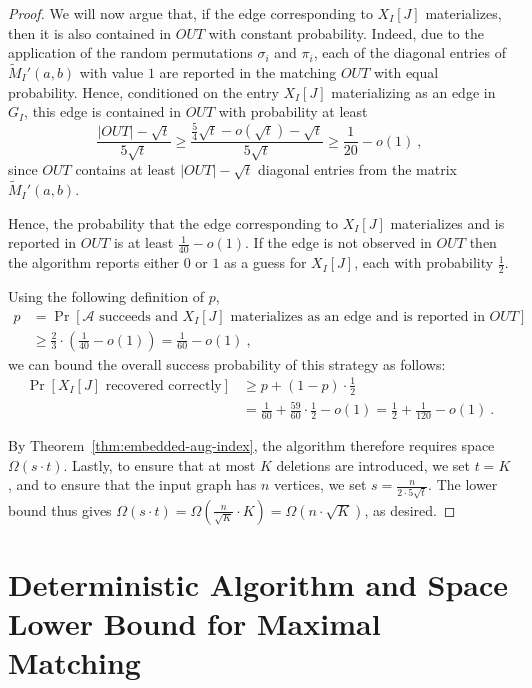 \documentclass[11pt,a4paper]{article}
\begin{document}
\begin{proof}
We will now argue that, if the edge corresponding to $X_I[J]$ materializes, then it is also contained in $OUT$ with constant probability. Indeed, due to the application of the random permutations $\sigma_i$ and $\pi_i$, each of the diagonal entries of $\tilde{M}_I'(a,b)$ with value $1$ are reported in the matching $OUT$ with equal probability. Hence, conditioned on the entry $X_I[J]$ materializing as an edge in $G_I$, this edge is contained in $OUT$ with probability at least 
$$\frac{|OUT| - \sqrt{t}}{5 \sqrt{t}} \ge \frac{\frac{5}{4} \sqrt{t} - o(\sqrt{t}) - \sqrt{t}}{5 \sqrt{t} } \ge \frac{1}{20} - o(1) \ , $$ since $OUT$ contains at least $|OUT| - \sqrt{t}$ diagonal entries from the matrix $\tilde{M}_I'(a,b)$. 

Hence, the probability that the edge corresponding to $X_I[J]$ materializes and is reported in $OUT$ is at least $\frac{1}{40} - o(1)$. If the edge is not observed in $OUT$ then the algorithm reports either $0$  or $1$ as a guess for $X_I[J]$, each with probability $\frac{1}{2}$. 

Using the following definition of $p$,
\begin{align*}
    p & = \Pr[\mathcal{A} \mbox{ succeeds and } X_I[J] \mbox{ materializes as an edge and is reported in } OUT] \\
    & \ge \frac{2}{3} \cdot (\frac{1}{40}-o(1)) = \frac{1}{60} - o(1) \ ,    
\end{align*} 
we can bound the overall success probability of this strategy as follows:
\begin{align*}
  \Pr[X_I[J]  \mbox{ recovered correctly}] & 
  \ge p + (1-p) \cdot \frac{1}{2} \\
  & = \frac{1}{60} + \frac{59}{60} \cdot \frac{1}{2} - o(1)  = \frac{1}{2} + \frac{1}{120} - o(1) \ .
\end{align*}



By Theorem~\ref{thm:embedded-aug-index}, the algorithm therefore requires space $\Omega(s \cdot t)$. Lastly, to ensure that at most $K$ deletions are introduced, we set $t = K$, and to ensure that the input graph has $n$ vertices, we set $s = \frac{n}{2 \cdot 5 \sqrt{t}}$. The lower bound thus gives $\Omega(s \cdot t) = \Omega(\frac{n}{\sqrt{K}} \cdot K) = \Omega(n \cdot \sqrt{K})$, as desired.
\end{proof}




\section{Deterministic Algorithm and Space Lower Bound for \textsf{Maximal Matching}} \label{sec:det}
\end{document}
